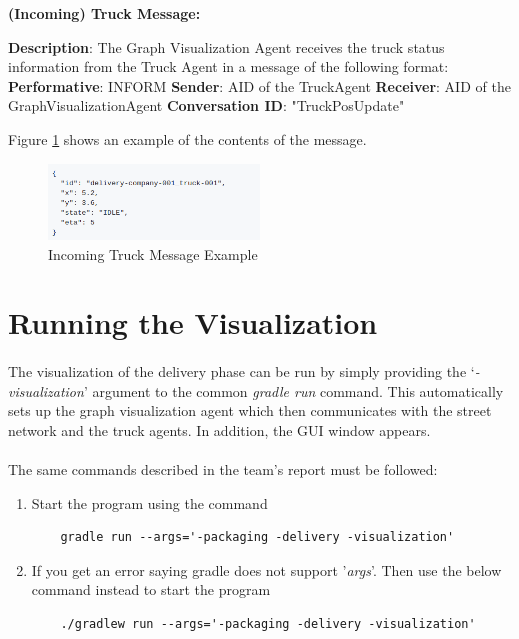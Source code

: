 \documentclass[11pt, a4paper]{article}
\begin{document}
\hfill\break	
\textbf{(Incoming) Truck Message:}

\hfill\break
\textbf{Description}:
The Graph Visualization Agent receives the truck status information from the Truck Agent in a message of the following format:
\hfill\break
\textbf{Performative}: INFORM
\hfill\break
\textbf{Sender}: AID of the TruckAgent
\hfill\break
\textbf{Receiver}: AID of the GraphVisualizationAgent
\hfill\break
\textbf{Conversation ID}: "TruckPosUpdate"

\hfill\break
Figure \ref{graphVisTruckmsgexample} shows an example of the contents of the message.

\begin{figure}[h!]
	\centering
	\includegraphics[width=0.5\textwidth]{../images/graphVisTruckmsgexample.png}
	\caption{Incoming Truck Message Example}
	\label{graphVisTruckmsgexample}
\end{figure}

\pagebreak
\newpage

\section{Running the Visualization}
\paragraph{}
The visualization of the delivery phase can be run by simply providing the `\textit{-visualization}' argument to the common \textit{gradle run} command. This automatically sets up the graph visualization agent which then communicates with the street network and the truck agents. In addition, the GUI window appears.

\paragraph{}
The same commands described in the team's report must be followed:
\begin{enumerate} 
	\item Start the program using the command
	\begin{verbatim}
	gradle run --args='-packaging -delivery -visualization'
	\end{verbatim}
	\item If you get an error saying gradle does not support '\textit{args}'. Then use the below command instead to start the program
	\begin{verbatim}
	./gradlew run --args='-packaging -delivery -visualization'
	\end{verbatim}
\end{enumerate}
\end{document}
